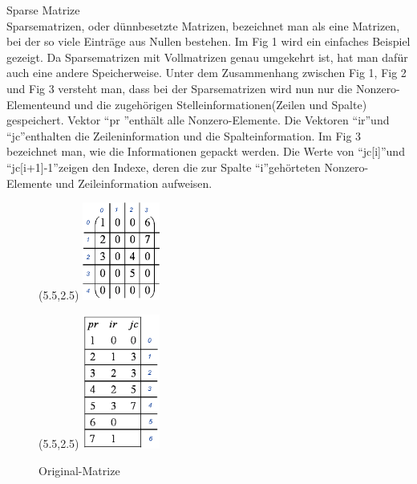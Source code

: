 
Sparse Matrize\\
Sparsematrizen, oder dünnbesetzte Matrizen,  bezeichnet man als eine Matrizen, bei der so viele Einträge aus Nullen bestehen. Im Fig 1 wird ein einfaches Beispiel gezeigt. 
Da Sparsematrizen mit Vollmatrizen genau umgekehrt ist, hat man dafür auch eine andere Speicherweise. Unter dem Zusammenhang zwischen Fig 1, Fig 2 und Fig 3 versteht man, dass bei der Sparsematrizen wird nun nur die Nonzero-Elementeund und die zugehörigen Stelleinformationen(Zeilen und Spalte) gespeichert. Vektor \textquotedblleft pr \textquotedblright enthält alle Nonzero-Elemente. Die Vektoren \textquotedblleft ir\textquotedblright und \textquotedblleft jc\textquotedblright enthalten die Zeileninformation und die Spalteinformation. Im Fig 3 bezeichnet man, wie die Informationen gepackt werden. Die Werte von \textquotedblleft jc[i]\textquotedblright und \textquotedblleft jc[i+1]-1\textquotedblright zeigen den Indexe, deren die zur Spalte \textquotedblleft i\textquotedblright  gehörteten Nonzero-Elemente und Zeileinformation aufweisen. 


\begin{figure}[b]
\setlength{\unitlength}{1cm}
	\begin{minipage}[t]{5.5cm}
	\begin{picture}(5.5,2.5)
	\includegraphics[width=1in]{.//pic//orignal_sparse}
	\end{picture}\par
	\caption{Original-Matrize}
	\end{minipage}\hfill
	\begin{minipage}[t]{5.5cm}
	\begin{picture}(5.5,2.5)
	\includegraphics[width=1in]{.//pic//numerische_sparse2}
	\end{picture}\par
	\end{minipage}\hfill
\end{figure}